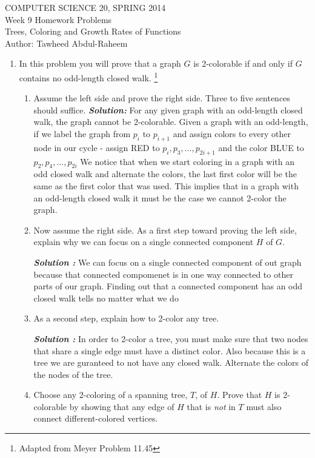 \documentclass[12pt]{article}
\begin{document}
\begin{center}
    COMPUTER SCIENCE 20, SPRING 2014 \\
    Week 9 Homework Problems\\
    Trees, Coloring and Growth Rates of Functions \\
    Author: Tawheed Abdul-Raheem 
\end{center}


\smallskip


\begin{enumerate}
    \item 
        In this problem you will prove that a graph $G$ is 2-colorable if and only if $G$ contains no odd-length closed walk.
        \footnote{Adapted from Meyer Problem 11.45}
        \begin{enumerate}
            \item Assume the left side and prove the right side.  Three to five sentences should suffice.
                \textbf{\textit{Solution: }} For any given graph with an odd-length closed walk, the graph cannot be 2-colorable. Given a graph with
                an odd-length, if we label the graph from $p_{i} \text{ to } p_{i+1}$ and assign colors to every other node in our cycle - assign
                {\color{red}RED } to $p_i, p_3, ..., p_{2i+1}$ and the color {\color{blue}BLUE } to $p_2, p_4, ..., p_{2i}$ We notice that when we start
                coloring in a graph with an odd closed walk and alternate the colors, the last first color will be the same as the first color that was
                used. This implies that in a graph with an odd-length closed walk it must be the case we cannot 2-color the graph.
            \item Now assume the right side.  As a first step toward proving the left side, explain why we can focus on a single connected 
                component $H$ of $G$.
                
                \textbf{\textit{Solution :}} We can focus on a single connected component of out graph because that connected compomenet is in one way connected to other parts of our graph. Finding out that a connected component has an odd closed walk tells no matter what we do
            \item As a second step, explain how to 2-color any tree.

                \textbf{\textit{Solution :}} In order to 2-color a tree, you must make sure that two nodes that share a single edge must have a distinct color. Also because this is a tree we are guranteed to not have any closed walk. Alternate the colors of the nodes of the tree. 
            \item Choose any 2-coloring of a spanning tree, $T$, of $H$.  Prove that $H$ is 2-colorable by showing that any edge of $H$ that is 
                \emph{not} in $T$ must also connect different-colored vertices.
                

\end{enumerate}
\end{enumerate}
\end{document}
